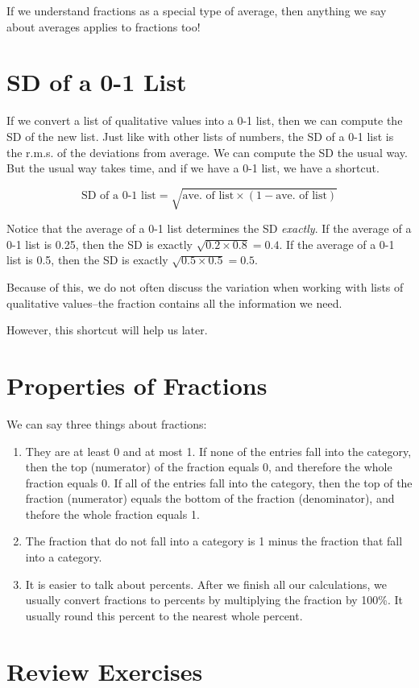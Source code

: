\documentclass[]{book}
\providecommand{\tightlist}{%
  \setlength{\itemsep}{0pt}\setlength{\parskip}{0pt}}
\theoremstyle{definition}
\theoremstyle{definition}
\theoremstyle{definition}
\theoremstyle{remark}
\begin{document}
If we understand fractions as a special type of average, then anything
we say about averages applies to fractions too!

\section{SD of a 0-1 List}\label{sd-of-a-0-1-list}

If we convert a list of qualitative values into a 0-1 list, then we can
compute the SD of the new list. Just like with other lists of numbers,
the SD of a 0-1 list is the r.m.s. of the deviations from average. We
can compute the SD the usual way. But the usual way takes time, and if
we have a 0-1 list, we have a shortcut.

\[\text{SD of a 0-1 list} = \sqrt{\text{ave. of list} \times (1 - \text{ave. of list})}\]

Notice that the average of a 0-1 list determines the SD \emph{exactly}.
If the average of a 0-1 list is 0.25, then the SD is exactly
\(\sqrt{0.2 \times 0.8} = 0.4\). If the average of a 0-1 list is 0.5,
then the SD is exactly \(\sqrt{0.5 \times 0.5} = 0.5\).

Because of this, we do not often discuss the variation when working with
lists of qualitative values--the fraction contains all the information
we need.

However, this shortcut will help us later.

\section{Properties of Fractions}\label{properties-of-fractions}

We can say three things about fractions:

\begin{enumerate}
\def\labelenumi{\arabic{enumi}.}
\tightlist
\item
  They are at least 0 and at most 1. If none of the entries fall into
  the category, then the top (numerator) of the fraction equals 0, and
  therefore the whole fraction equals 0. If all of the entries fall into
  the category, then the top of the fraction (numerator) equals the
  bottom of the fraction (denominator), and thefore the whole fraction
  equals 1.
\item
  The fraction that do not fall into a category is 1 minus the fraction
  that fall into a category.
\item
  It is easier to talk about percents. After we finish all our
  calculations, we usually convert fractions to percents by multiplying
  the fraction by 100\%. It usually round this percent to the nearest
  whole percent.
\end{enumerate}

\section{Review Exercises}\label{review-exercises-1}


\end{document}
